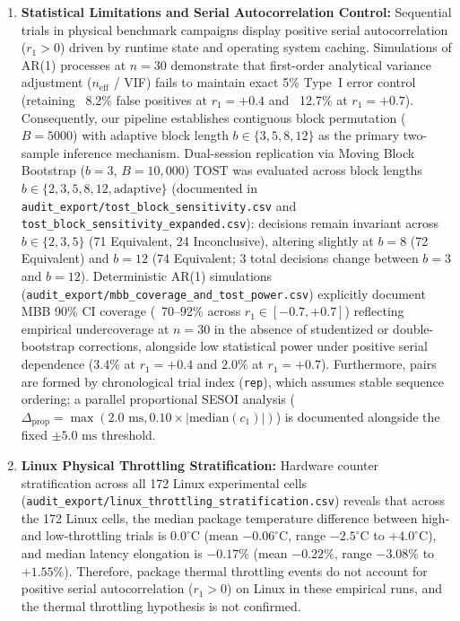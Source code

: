 \documentclass[11pt,a4paper]{article}
\begin{document}
\begin{enumerate}
    \item \textbf{Statistical Limitations and Serial Autocorrelation Control:} Sequential trials in physical benchmark campaigns display positive serial autocorrelation ($r_1 > 0$) driven by runtime state and operating system caching. Simulations of AR(1) processes at $n=30$ demonstrate that first-order analytical variance adjustment ($n_{\text{eff}}$ / VIF) fails to maintain exact 5\% Type~I error control (retaining ~8.2\% false positives at $r_1=+0.4$ and ~12.7\% at $r_1=+0.7$). Consequently, our pipeline establishes contiguous block permutation ($B=5000$) with adaptive block length $b \in \{3, 5, 8, 12\}$ as the primary two-sample inference mechanism. Dual-session replication via Moving Block Bootstrap ($b=3$, $B=10{,}000$) TOST was evaluated across block lengths $b \in \{2, 3, 5, 8, 12, \text{adaptive}\}$ (documented in \texttt{audit\_export/tost\_block\_sensitivity.csv} and \texttt{tost\_block\_sensitivity\_expanded.csv}): decisions remain invariant across $b \in \{2, 3, 5\}$ (71 Equivalent, 24 Inconclusive), altering slightly at $b=8$ (72 Equivalent) and $b=12$ (74 Equivalent; 3 total decisions change between $b=3$ and $b=12$). Deterministic AR(1) simulations (\texttt{audit\_export/mbb\_coverage_and\_tost\_power.csv}) explicitly document MBB 90\% CI coverage (~70--92\% across $r_1 \in [-0.7, +0.7]$) reflecting empirical undercoverage at $n=30$ in the absence of studentized or double-bootstrap corrections, alongside low statistical power under positive serial dependence ($3.4\%$ at $r_1=+0.4$ and $2.0\%$ at $r_1=+0.7$). Furthermore, pairs are formed by chronological trial index (\texttt{rep}), which assumes stable sequence ordering; a parallel proportional SESOI analysis ($\Delta_{\text{prop}} = \max(2.0\text{ ms}, 0.10 \times |\text{median}(c_1)|)$) is documented alongside the fixed $\pm 5.0\text{ ms}$ threshold.
    \item \textbf{Linux Physical Throttling Stratification:} Hardware counter stratification across all 172 Linux experimental cells (\texttt{audit\_export/linux\_throttling\_stratification.csv}) reveals that across the 172 Linux cells, the median package temperature difference between high- and low-throttling trials is $0.0^\circ\text{C}$ (mean $-0.06^\circ\text{C}$, range $-2.5^\circ\text{C}$ to $+4.0^\circ\text{C}$), and median latency elongation is $-0.17\%$ (mean $-0.22\%$, range $-3.08\%$ to $+1.55\%$). Therefore, package thermal throttling events do not account for positive serial autocorrelation ($r_1 > 0$) on Linux in these empirical runs, and the thermal throttling hypothesis is not confirmed.

\end{enumerate}
\end{document}
